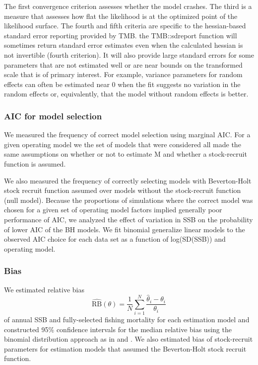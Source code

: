 \documentclass[
  12pt,
]{article}
\begin{document}
The first convergence criterion assesses whether the model crashes. The
third is a measure that assesses how flat the likelihood is at the
optimized point of the likelihood surface. The fourth and fifth criteria
are specific to the hessian-based standard error reporting provided by
TMB. the TMB::sdreport function will sometimes return standard error
estimates even when the calculated hessian is not invertible (fourth
criterion). It will also provide large standard errors for some
parameters that are not estimated well or are near bounds on the
transformed scale that is of primary interest. For example, variance
parameters for random effects can often be estimated near 0 when the fit
suggests no variation in the random effects or, equivalently, that the
model without random effects is better.

\hypertarget{aic-for-model-selection}{%
\subsubsection*{AIC for model selection}\label{aic-for-model-selection}}

We measured the frequency of correct model selection using marginal AIC.
For a given operating model we the set of models that were considered
all made the same assumptions on whether or not to estimate M and
whether a stock-recruit function is assumed.

We also measured the frequency of correctly selecting models with
Beverton-Holt stock recruit function assumed over models without the
stock-recruit function (null model). Because the proportions of
simulations where the correct model was chosen for a given set of
operating model factors implied generally poor performance of AIC, we
analyzed the effect of variation in SSB on the probability of lower AIC
of the BH models. We fit binomial generalize linear models to the
observed AIC choice for each data set as a function of log(SD(SSB)) and
operating model.

\hypertarget{bias}{%
\subsubsection*{Bias}\label{bias}}

We estimated relative bias \[
\widehat {\text{RB}}\left(\theta\right) = \frac{1}{N} \sum^N_{i = 1} \frac{\widehat \theta_i - \theta_i}{\theta_i}
\] of annual SSB and fully-selected fishing mortality for each
estimation model and constructed 95\% confidence intervals for the
median relative bias using the binomial distribution approach as in
\citet{millerhyun18} and \citet{stockmiller21}. We also estimated bias
of stock-recruit parameters for estimation models that assumed the
Beverton-Holt stock recruit function.
\end{document}
